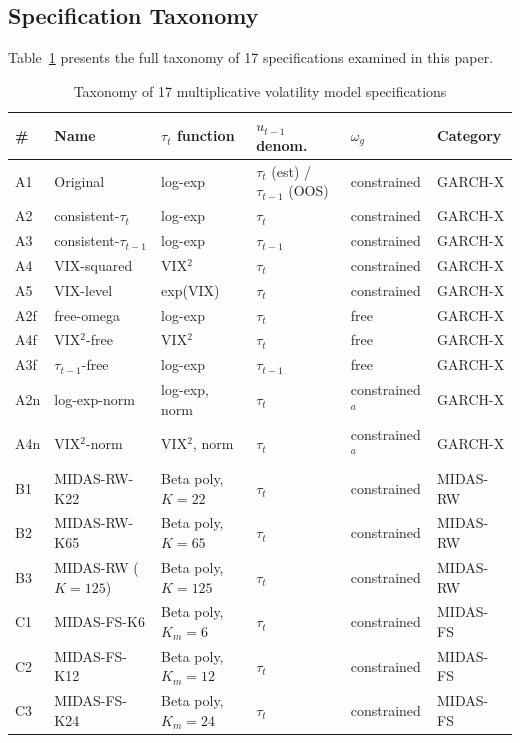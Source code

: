 \documentclass[12pt,a4paper]{article}
\begin{document}
\subsection{Specification Taxonomy}
\label{sec:taxonomy}

Table~\ref{tab:specs} presents the full taxonomy of 17 specifications examined in this paper.

\begin{table}[H]
\centering
\caption{Taxonomy of 17 multiplicative volatility model specifications}
\label{tab:specs}
\begin{threeparttable}
\small
\begin{tabular}{@{}llllll@{}}
\toprule
\# & Name & $\tau_t$ function & $u_{t-1}$ denom. & $\omega_g$ & Category \\
\midrule
A1 & Original & log-exp & $\tau_t$ (est) / $\tau_{t-1}$ (OOS) & constrained & GARCH-X \\
A2 & consistent-$\tau_t$ & log-exp & $\tau_t$ & constrained & GARCH-X \\
A3 & consistent-$\tau_{t-1}$ & log-exp & $\tau_{t-1}$ & constrained & GARCH-X \\
A4 & VIX-squared & VIX$^2$ & $\tau_t$ & constrained & GARCH-X \\
A5 & VIX-level & exp(VIX) & $\tau_t$ & constrained & GARCH-X \\
A2f & free-omega & log-exp & $\tau_t$ & free & GARCH-X \\
A4f & VIX$^2$-free & VIX$^2$ & $\tau_t$ & free & GARCH-X \\
A3f & $\tau_{t-1}$-free & log-exp & $\tau_{t-1}$ & free & GARCH-X \\
A2n & log-exp-norm & log-exp, norm & $\tau_t$ & constrained$^a$ & GARCH-X \\
A4n & VIX$^2$-norm & VIX$^2$, norm & $\tau_t$ & constrained$^a$ & GARCH-X \\
\midrule
B1 & MIDAS-RW-K22 & Beta poly, $K=22$ & $\tau_t$ & constrained & MIDAS-RW \\
B2 & MIDAS-RW-K65 & Beta poly, $K=65$ & $\tau_t$ & constrained & MIDAS-RW \\
B3 & MIDAS-RW ($K=125$) & Beta poly, $K=125$ & $\tau_t$ & constrained & MIDAS-RW \\
C1 & MIDAS-FS-K6 & Beta poly, $K_m=6$ & $\tau_t$ & constrained & MIDAS-FS \\
C2 & MIDAS-FS-K12 & Beta poly, $K_m=12$ & $\tau_t$ & constrained & MIDAS-FS \\
C3 & MIDAS-FS-K24 & Beta poly, $K_m=24$ & $\tau_t$ & constrained & MIDAS-FS \\

\end{tabular}
\end{threeparttable}
\end{table}
\end{document}
